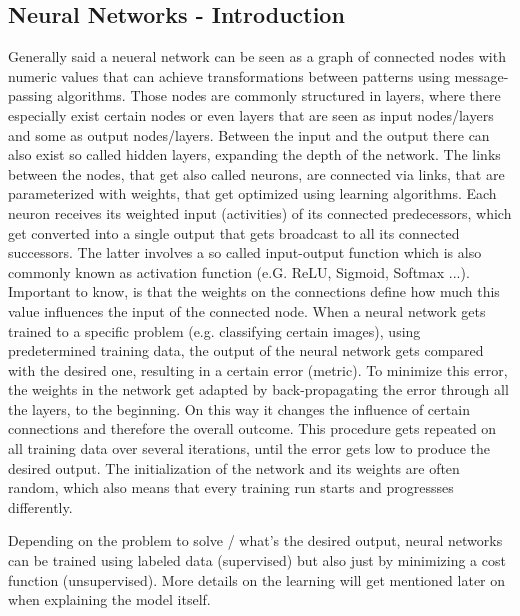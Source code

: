 \subsection{Neural Networks - Introduction}
Generally said a neueral network can be seen as a graph of connected nodes  with numeric values that can achieve transformations between patterns using message-passing algorithms. \cite{Jordan1996neuralnets} Those nodes are commonly structured in layers, where there especially exist certain nodes or even layers that are seen as input nodes/layers and some as output nodes/layers. Between the input and the output there can also exist so called hidden layers, expanding the depth of the network. The links between the nodes, that get also called neurons, are connected via links, that are parameterized with weights, that get optimized using learning algorithms. Each neuron receives its weighted input (activities) of its connected predecessors, which get converted into a single output that gets broadcast to all its connected successors. \cite{hinton1992neural} The latter involves a so called input-output function which is also commonly known as activation function (e.G. ReLU, Sigmoid, Softmax ...). Important to know, is that the weights on the connections define how much this value influences the input of the connected node. 
When a neural network gets trained to a specific problem (e.g. classifying certain images), using predetermined training data, the output of the neural network gets compared with the desired one, resulting in a certain error (metric). To minimize this error, the weights in the network get adapted by back-propagating the error through all the layers, to the beginning. On this way it changes the influence of certain connections and therefore the overall outcome. This procedure gets repeated on all training data over several iterations, until the error gets low to produce the desired output. The initialization of the network and its weights are often random, which also means that every training run starts and progressses differently.

Depending on the problem to solve / what's the desired output, neural networks can be trained using labeled data (supervised) but also just by minimizing a cost function (unsupervised).\cite{oshea2015introductionConv} More details on the learning will get mentioned later on when explaining the model itself. 

